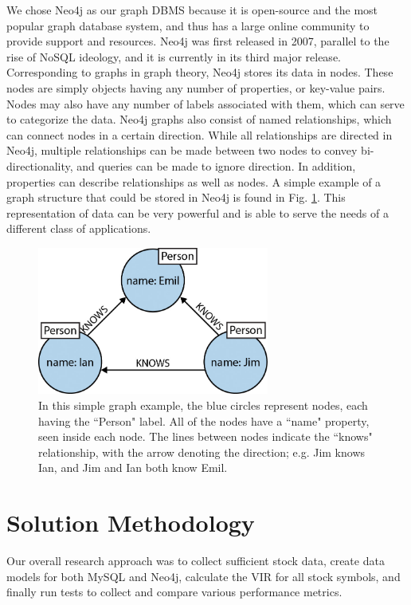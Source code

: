 \documentclass{IEEEtran}
\begin{document}
We chose Neo4j as our graph DBMS because it is open-source and the most popular graph database system, and thus has a large online community to provide support and resources. Neo4j was first released in 2007, parallel to the rise of NoSQL ideology, and it is currently in its third major release. Corresponding to graphs in graph theory, Neo4j stores its data in nodes. These nodes are simply objects having any number of properties, or key-value pairs. Nodes may also have any number of labels associated with them, which can serve to categorize the data. Neo4j graphs also consist of named relationships, which can connect nodes in a certain direction. While all relationships are directed in Neo4j, multiple relationships can be made between two nodes to convey bi-directionality, and queries can be made to ignore direction. In addition, properties can describe relationships as well as nodes. A simple example of a graph structure that could be stored in Neo4j is found in Fig. \ref{fig:graphdb_ex}. This representation of data can be very powerful and is able to serve the needs of a different class of applications.    

\begin{figure}
	\centering
	\includegraphics[width=3in]{Images/graphdb_simple_example.jpg}
	\caption{In this simple graph example, the blue circles represent nodes, each having the ``Person" label. All of the nodes have a ``name" property, seen inside each node. The lines between nodes indicate the ``knows" relationship, with the arrow denoting the direction; e.g. Jim knows Ian, and Jim and Ian both know Emil.}
	\label{fig:graphdb_ex}
\end{figure}  

\section{Solution Methodology}

Our overall research approach was to collect sufficient stock data, create data models for both MySQL and Neo4j, calculate the VIR for all stock symbols, and finally run tests to collect and compare various performance metrics. 
\end{document}
